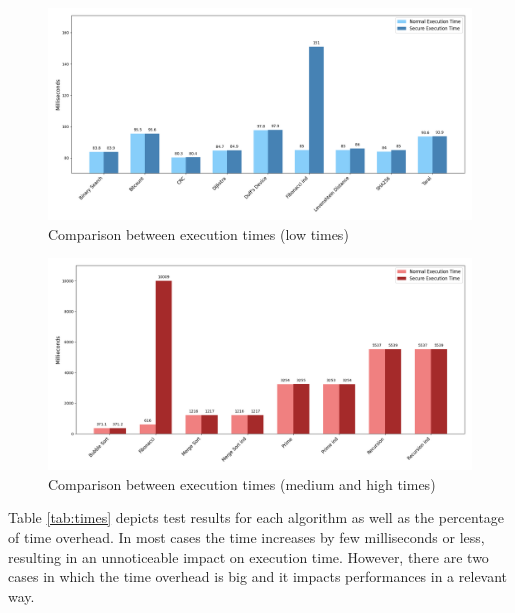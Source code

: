 \begin{figure}[htbp]
  \centering
  \includegraphics[width=\linewidth]{images/low_times.png}
  \caption{Comparison between execution times (low times)}
  \label{fig:lowtime}
\end{figure}

\begin{figure}[htbp]
  \centering
  \includegraphics[width=\linewidth]{images/high_times.png}
  \caption{Comparison between execution times (medium and high times)}
  \label{fig:hightime}
\end{figure}

Table \ref{tab:times} depicts test results for each algorithm as well as the
percentage of time overhead. In most cases the time increases by few milliseconds
or less, resulting in an unnoticeable impact on execution time. However, there
are two cases in which the time overhead is big and it impacts performances in a
relevant way.

